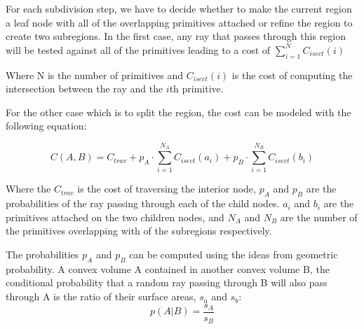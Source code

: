 For each subdivision step, we have to decide whether to make the current region a leaf node with all of the overlapping primitives attached or refine the region to create two subregions. In the first case, any ray that passes through this region will be tested against all of the primitives leading to a cost of 
	$\displaystyle\sum\limits_{i=1}^N C_{isect}(i)$

Where N is the number of primitives and \(C_{isect}(i)\) is the cost of computing the intersection between the ray and the \(i\)th primitive. 

For the other case which is to split the region, the cost can be modeled with the following equation:

\begin{equation} 
	\label{eq:CostOneStep}
	C(A, B) = C_{trav} + p_{A} \cdot \sum\limits_{i=1}^{N_{A}} C_{isect}(a_{i}) + p_{B} \cdot \sum\limits_{i=1}^{N_{B}} C_{isect}(b_{i})
\end{equation}

Where the \(C_{trav}\) is the cost of traversing the interior node, \(p_{A}\) and \(p_{B}\) are the probabilities of the ray passing through each of the child nodes. \(a_{i}\) and \(b_{i}\) are the primitives attached on the two children nodes, and \(N_{A}\) and \(N_{B}\) are the number of the primitives overlapping with of the subregions respectively. 

The probabilities \(p_{A}\) and \(p_{B}\) can be computed using the ideas from geometric probability. A convex volume A contained in another convex volume B, the conditional probability that a random ray passing through B will also pass through A is the ratio of their surface areas, \(s_{a}\) and \(s_{b}\): 
\begin{equation} 
	p(A|B) = \frac{s_{A}}{s_{B}} 
\end{equation}

